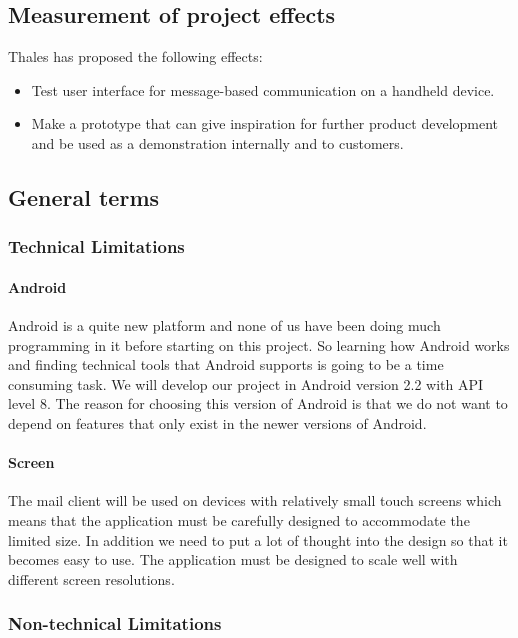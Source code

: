 \subsection{Measurement of project effects}

Thales has proposed the following effects:
\begin{itemize}
\item{}Test user interface for message-based communication on a handheld device.
\item{}Make a prototype that can give inspiration for further product development and be used as a demonstration internally and to customers.
\end{itemize}

\subsection{General terms}

\subsubsection{Technical Limitations}

\paragraph{Android}
Android is a quite new platform and none of us have been doing much programming in it before starting on this project. So learning how Android works and finding technical tools that Android supports is going to be a time consuming task. We will develop our project in Android version 2.2 with API level 8. The reason for choosing this version of Android is that we do not want to depend on features that only exist in the newer versions of Android. 

\paragraph{Screen}
The mail client will be used on devices with relatively small touch screens which means that the application must be carefully designed to accommodate the limited size. In addition we need to put a lot of thought into the design so that it becomes easy to use. The application must be designed to scale well with different screen resolutions.

\subsubsection{Non-technical Limitations}

